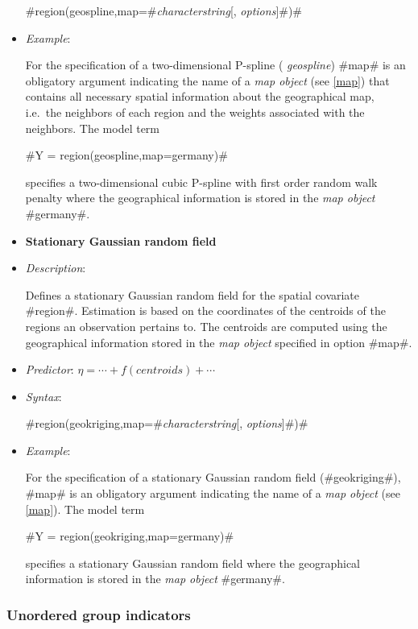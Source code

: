 \begin{itemize}
#region(geospline,map=#{\em characterstring}[, {\em options}]#)#
\item[] {\em Example}:

For the specification of a two-dimensional P-spline ({\em
geospline}) #map# is an obligatory argument indicating the name of
a {\em map object} (see \autoref{map}) that contains all necessary
spatial information about the geographical map, i.e.~the neighbors
of each region and the weights associated with the neighbors. The
model term

#Y = region(geospline,map=germany)#

specifies a two-dimensional cubic P-spline with first order random
walk penalty where the geographical information is stored in the
{\em map object} #germany#.

\item[]{\bf\sffamily Stationary Gaussian random field}

\item[] {\em Description}:

Defines a stationary Gaussian random field for the spatial
covariate #region#. Estimation is based on the coordinates of the
centroids of the regions an observation pertains to. The centroids
are computed using the geographical information stored in the {\em
map object} specified in option #map#. \item[] {\em Predictor}:
$\eta= \cdots + f(centroids) + \cdots$ \item[] {\em Syntax}:

#region(geokriging,map=#{\em characterstring}[, {\em options}]#)#
\item[] {\em Example}:

For the specification of a stationary Gaussian random field
(#geokriging#), #map# is an obligatory argument indicating the
name of a {\em map object} (see \autoref{map}). The model term

#Y = region(geokriging,map=germany)#

specifies a stationary Gaussian random field where the geographical
information is stored in the {\em map object} #germany#.
\end{itemize}

\subsubsection*{Unordered group indicators}

